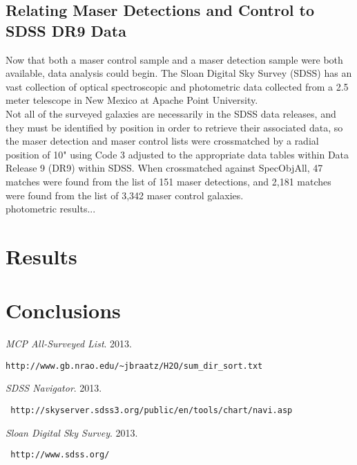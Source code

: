 \documentclass[12pt]{article}
\begin{document}
\subsection{Relating Maser Detections and Control to SDSS DR9 Data}\label{control}
\indent Now that both a maser control sample and a maser detection sample were both available, data analysis could begin. The Sloan Digital Sky Survey (SDSS) has an vast collection of optical spectroscopic and photometric data collected from a 2.5 meter telescope in New Mexico at Apache Point University\cite{sdss}.\\

Not all of the surveyed galaxies are necessarily in the SDSS data releases, and they must be identified by position in order to retrieve their associated data, so the maser detection and maser control lists were crossmatched by a radial position of 10" using Code 3 adjusted to the appropriate data tables within Data Release 9 (DR9) within SDSS. When crossmatched against SpecObjAll, 47 matches were found from the list of 151 maser detections, and 2,181 matches were found from the list of 3,342 maser control galaxies.\\

photometric results...

\section{Results}\label{results}

\section{Conclusions}\label{conclusion}

\begin{thebibliography}{1}
  \emph{MCP All-Surveyed List}.
  2013. \begin{verbatim}http://www.gb.nrao.edu/~jbraatz/H2O/sum_dir_sort.txt\end{verbatim} 
  
  \emph{SDSS Navigator}.
  2013. \begin{verbatim} http://skyserver.sdss3.org/public/en/tools/chart/navi.asp\end{verbatim} 

  \emph{Sloan Digital Sky Survey}.
  2013. \begin{verbatim} http://www.sdss.org/\end{verbatim} 
  
\end{thebibliography}
\end{document}
